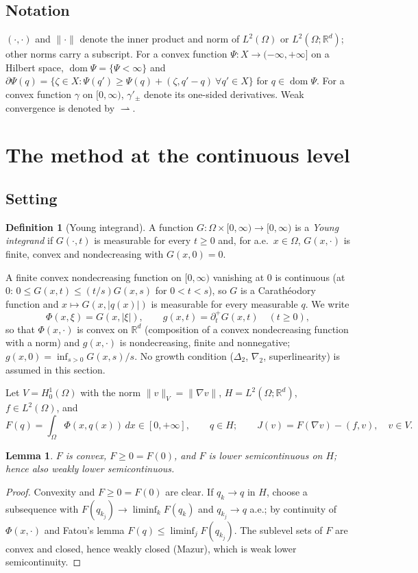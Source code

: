\documentclass[11pt]{amsart}
\newtheorem{lemma}[theorem]{Lemma}
\theoremstyle{definition}
\newtheorem{definition}[theorem]{Definition}
\theoremstyle{remark}
\numberwithin{equation}{section}
\newcommand{\R}{\mathbb{R}}
\newcommand{\dx}{\,dx}
\newcommand{\abs}[1]{\lvert #1\rvert}
\newcommand{\norm}[1]{\lVert #1\rVert}
\DeclareMathOperator{\dom}{dom}
\newcommand{\weak}{\rightharpoonup}
\begin{document}
\subsection*{Notation}
$(\cdot,\cdot)$ and $\norm\cdot$ denote the inner product and norm of $L^2(\Omega)$ or $L^2(\Omega;\R^d)$; other norms carry a subscript. For a convex function $\Psi\colon X\to(-\infty,+\infty]$ on a Hilbert space, $\dom\Psi=\{\Psi<\infty\}$ and $\partial\Psi(q)=\{\zeta\in X:\Psi(q')\ge\Psi(q)+(\zeta,q'-q)\ \forall q'\in X\}$ for $q\in\dom\Psi$. For a convex function $\gamma$ on $[0,\infty)$, $\gamma'_\pm$ denote its one-sided derivatives. Weak convergence is denoted by $\weak$.

\section{The method at the continuous level}\label{sec:continuous}

\subsection{Setting}\label{ssec:setting}
\begin{definition}[Young integrand]\label{def:young}
A function $G\colon\Omega\times[0,\infty)\to[0,\infty)$ is a \emph{Young integrand} if $G(\cdot,t)$ is measurable for every $t\ge0$ and, for a.e.\ $x\in\Omega$, $G(x,\cdot)$ is finite, convex and nondecreasing with $G(x,0)=0$.
\end{definition}
A finite convex nondecreasing function on $[0,\infty)$ vanishing at $0$ is continuous (at $0$: $0\le G(x,t)\le (t/s)G(x,s)$ for $0<t<s$), so $G$ is a Carath\'eodory function and $x\mapsto G(x,\abs{q(x)})$ is measurable for every measurable $q$. We write
\[
\Phi(x,\xi)=G(x,\abs\xi),\qquad g(x,t)=\partial_t^+G(x,t)\quad(t\ge0),
\]
so that $\Phi(x,\cdot)$ is convex on $\R^d$ (composition of a convex nondecreasing function with a norm) and $g(x,\cdot)$ is nondecreasing, finite and nonnegative; $g(x,0)=\inf_{s>0}G(x,s)/s$. No growth condition ($\Delta_2$, $\nabla_2$, superlinearity) is assumed in this section.

Let $V=H^1_0(\Omega)$ with the norm $\norm{v}_V=\norm{\nabla v}$, $H=L^2(\Omega;\R^d)$, $f\in L^2(\Omega)$, and
\[
F(q)=\int_\Omega\Phi(x,q(x))\dx\in[0,+\infty],\qquad q\in H;\qquad J(v)=F(\nabla v)-(f,v),\quad v\in V .
\]
\begin{lemma}\label{lem:F}
$F$ is convex, $F\ge0=F(0)$, and $F$ is lower semicontinuous on $H$; hence also weakly lower semicontinuous.
\end{lemma}
\begin{proof}
Convexity and $F\ge 0=F(0)$ are clear. If $q_k\to q$ in $H$, choose a subsequence with $F(q_{k_j})\to\liminf_kF(q_k)$ and $q_{k_j}\to q$ a.e.; by continuity of $\Phi(x,\cdot)$ and Fatou's lemma $F(q)\le\liminf_jF(q_{k_j})$. The sublevel sets of $F$ are convex and closed, hence weakly closed (Mazur), which is weak lower semicontinuity.
\end{proof}
\end{document}
